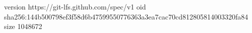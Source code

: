 version https://git-lfs.github.com/spec/v1
oid sha256:144b500798ef3f58d6b47599550776363a3ea7cac70cd812805814003320fa84
size 1048672
